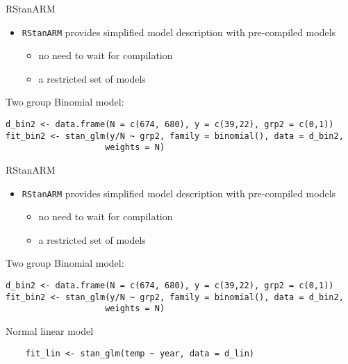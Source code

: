 \documentclass[finnish,english,t]{beamer}
\begin{document}
\begin{frame}[fragile]{RStanARM}

  \begin{itemize}
  \item \texttt{RStanARM} provides simplified model description with
    pre-compiled models
    \begin{itemize}
    \item no need to wait for compilation
    \item a restricted set of models
    \end{itemize}
  \end{itemize}

Two group Binomial model:
  {\footnotesize
\begin{verbatim}
d_bin2 <- data.frame(N = c(674, 680), y = c(39,22), grp2 = c(0,1))
fit_bin2 <- stan_glm(y/N ~ grp2, family = binomial(), data = d_bin2,
                    weights = N)
\end{verbatim}
  }

    
\end{frame} 


\begin{frame}[fragile]{RStanARM}

  \begin{itemize}
  \item \texttt{RStanARM} provides simplified model description with
    pre-compiled models
    \begin{itemize}
    \item no need to wait for compilation
    \item a restricted set of models
    \end{itemize}
  \end{itemize}

Two group Binomial model:
  {\footnotesize
\begin{verbatim}
d_bin2 <- data.frame(N = c(674, 680), y = c(39,22), grp2 = c(0,1))
fit_bin2 <- stan_glm(y/N ~ grp2, family = binomial(), data = d_bin2,
                    weights = N)
\end{verbatim}
  }
    Normal linear model
  {\footnotesize
\begin{verbatim}
    fit_lin <- stan_glm(temp ~ year, data = d_lin)
\end{verbatim}
  }

    
\end{frame} 
\end{document}
